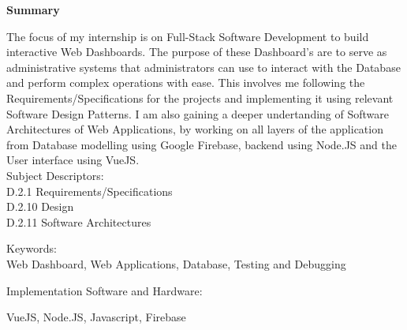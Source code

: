 \begin{center}
	\Large\textbf{Summary}
\end{center}
\noindent
The focus of my internship is on Full-Stack Software Development to build interactive Web Dashboards.
The purpose of these Dashboard's are to serve as administrative systems that administrators can use to interact
with the Database and perform complex operations with ease.
This involves me following the Requirements/Specifications for the projects and implementing it using relevant Software Design Patterns.
I am also gaining a deeper undertanding of Software Architectures of Web Applications, by working on all layers of the application from
Database modelling using Google Firebase, backend using Node.JS and the User interface using VueJS.
\\

\noindent
Subject Descriptors:\\
\indent D.2.1  Requirements/Specifications\\
\indent D.2.10 Design\\
\indent D.2.11 Software Architectures

\noindent
Keywords:\\
\indent Web Dashboard, Web Applications, Database, Testing and Debugging

\noindent
Implementation Software and Hardware:

\indent VueJS, Node.JS, Javascript, Firebase